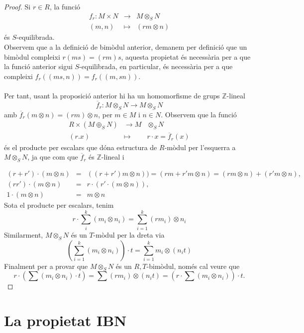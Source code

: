 \begin{proof}
Si $r\in R$, la funció 
\begin{eqnarray*}
f_r : M\times N &\rightarrow & M\otimes_S N\\
(m,n) & \mapsto & (rm \otimes n)
\end{eqnarray*}
és $S$-equilibrada.
\\
\hspace*{.5cm}Observem que a la definició de bimòdul anterior, demanem per definició que un bimòdul compleixi $r(ms)=(rm)s$, aquesta propietat és necessària per a que la funció anterior sigui $S$-equilibrada, en particular, és necessària per a que compleixi $f_r((ms,n))=f_r((m,sn))$. \\
\\
Per tant, usant la proposició anterior hi ha un homomorfisme de grups $\mathbb{Z}$-lineal
$$
\overline{f}_r: M \otimes_S N \rightarrow M \otimes_S N
$$
amb $\overline{f}_r(m\otimes n)=(rm) \otimes n$, per $m\in M$ i $n\in N$. Observem que la funció
\begin{eqnarray*}
R\times(M\oplus_SN) & \rightarrow M & \otimes_S N \\
(r.x) & \mapsto & r \cdot x = \overline{f}_r(x)
\end{eqnarray*}
és el producte per escalars que dóna estructura de $R$-mòdul per l'esquerra a $M\otimes_S N$, ja que com que $\overline{f}_r$ és $\mathbb{Z}$-lineal i

\begin{eqnarray*}
(r+r')\cdot (m\otimes n) &=& ((r+r')m \otimes n)) = (rm+r'm \otimes n)=(rm \otimes n) + (r'm \otimes n),\\
(rr')\cdot (m\otimes n) &=&r\cdot (r' \cdot  (m\otimes n)),\\
1\cdot(m\otimes n) &=& m\otimes n
\end{eqnarray*}
Sota el producte per escalars, tenim
$$
r \cdot \sum_i^k (m_i \otimes n_i) = \sum_{i=1}^{k}(rm_i)\otimes n_i
$$
Similarment, $M\otimes_S N$ és un $T$-mòdul per la dreta via 
$$
\left( \sum_{i=1}^k (m_i\otimes n_i) \right) \cdot t = \sum_{i=1}^k m_i \otimes (n_i t)
$$
Finalment per a provar que $M \otimes_S N$ és un $R,T$-bimòdul, només cal veure que 
$$
r\cdot \left(\sum (m_i \otimes n_i) \cdot t \right) = \sum (rm_i) \otimes (n_it) = (r\cdot \sum (m_i \otimes n_i)) \cdot t.
$$
\end{proof}


\section{La propietat IBN}

